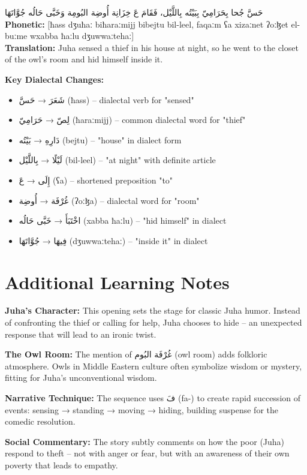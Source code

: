 \documentclass[letter,12pt]{article}
\begin{document}
\begin{tcolorbox}[colback=white,colframe=dialectcolor,title=\textbf{Levantine Version},breakable]
\textarabic{حَسَّ جُحا بِحَرَامِيّ بِبَيْتُه بِاللَّيْل، فَقَامَ عَ خِزَانِة أُوضِة البُومِة وَخَبَّى حَالُه جُوَّاتَهَا}\\
\textbf{Phonetic:} [ħass dʒuħaː biħaraːmijj bibejtu bil-leel, faqaːm ʕa xizaːnet ʔoːɮet el-buːme wxabba ħaːlu dʒuwwaːtehaː]\\
\textbf{Translation:} Juha sensed a thief in his house at night, so he went to the closet of the owl's room and hid himself inside it.
\end{tcolorbox}
\textbf{Key Dialectal Changes:}
\begin{itemize}
\item \textarabic{شَعَرَ} → \textarabic{حَسَّ} (ħass) – dialectal verb for "sensed"
\item \textarabic{لِصّ} → \textarabic{حَرَامِيّ} (ħaraːmijj) – common dialectal word for "thief"
\item \textarabic{دَارِهِ} → \textarabic{بَيْتُه} (bejtu) – "house" in dialect form
\item \textarabic{لَيْلًا} → \textarabic{بِاللَّيْل} (bil-leel) – "at night" with definite article
\item \textarabic{إِلَى} → \textarabic{عَ} (ʕa) – shortened preposition "to"
\item \textarabic{غُرْفَة} → \textarabic{أُوضِة} (ʔoːɮa) – dialectal word for "room"
\item \textarabic{اخْتَبَأَ} → \textarabic{خَبَّى حَالُه} (xabba ħaːlu) – "hid himself" in dialect
\item \textarabic{فِيهَا} → \textarabic{جُوَّاتَهَا} (dʒuwwaːtehaː) – "inside it" in dialect
\end{itemize}

\section{Additional Learning Notes}

\begin{tcolorbox}[colback=boxcolor,colframe=accentcolor,title=\textbf{Cultural and Literary Context},breakable]
\textbf{Juha's Character:} This opening sets the stage for classic Juha humor. Instead of confronting the thief or calling for help, Juha chooses to hide – an unexpected response that will lead to an ironic twist.

\textbf{The Owl Room:} The mention of \textarabic{غُرْفَة البُوم} (owl room) adds folkloric atmosphere. Owls in Middle Eastern culture often symbolize wisdom or mystery, fitting for Juha's unconventional wisdom.

\textbf{Narrative Technique:} The sequence uses \textarabic{فَ} (fa-) to create rapid succession of events: sensing → standing → moving → hiding, building suspense for the comedic resolution.

\textbf{Social Commentary:} The story subtly comments on how the poor (Juha) respond to theft – not with anger or fear, but with an awareness of their own poverty that leads to empathy.
\end{tcolorbox}
\end{document}
